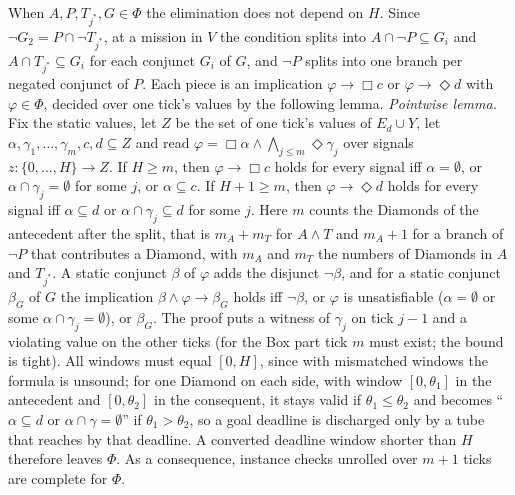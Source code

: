 \documentclass[10pt,a4paper]{article}
\begin{document}
\begin{enumerate}
When $A,P,T_{j^*},G\in\Phi$ the elimination does not depend on $H$. Since $\lnot G_2=P\cap\lnot T_{j^*}$, at a mission in $V$ the condition splits into $A\cap\lnot P\subseteq G_i$ and $A\cap T_{j^*}\subseteq G_i$ for each conjunct $G_i$ of $G$, and $\lnot P$ splits into one branch per negated conjunct of $P$. Each piece is an implication $\varphi\to\Box c$ or $\varphi\to\Diamond d$ with $\varphi\in\Phi$, decided over one tick's values by the following lemma. \emph{Pointwise lemma.} Fix the static values, let $Z$ be the set of one tick's values of $E_d\cup Y$, let $\alpha,\gamma_1,\dots,\gamma_m,c,d\subseteq Z$ and read $\varphi=\Box\alpha\wedge\bigwedge_{j\le m}\Diamond\gamma_j$ over signals $z:\{0,\dots,H\}\to Z$. If $H\ge m$, then $\varphi\to\Box c$ holds for every signal iff $\alpha=\emptyset$, or $\alpha\cap\gamma_j=\emptyset$ for some $j$, or $\alpha\subseteq c$. If $H+1\ge m$, then $\varphi\to\Diamond d$ holds for every signal iff $\alpha\subseteq d$ or $\alpha\cap\gamma_j\subseteq d$ for some $j$. Here $m$ counts the Diamonds of the antecedent after the split, that is $m_A+m_T$ for $A\wedge T$ and $m_A+1$ for a branch of $\lnot P$ that contributes a Diamond, with $m_A$ and $m_T$ the numbers of Diamonds in $A$ and $T_{j^*}$. A static conjunct $\beta$ of $\varphi$ adds the disjunct $\lnot\beta$, and for a static conjunct $\beta_G$ of $G$ the implication $\beta\wedge\varphi\to\beta_G$ holds iff $\lnot\beta$, or $\varphi$ is unsatisfiable ($\alpha=\emptyset$ or some $\alpha\cap\gamma_j=\emptyset$), or $\beta_G$. The proof puts a witness of $\gamma_j$ on tick $j-1$ and a violating value on the other ticks (for the Box part tick $m$ must exist; the bound is tight). All windows must equal $[0,H]$, since with mismatched windows the formula is unsound; for one Diamond on each side, with window $[0,\theta_1]$ in the antecedent and $[0,\theta_2]$ in the consequent, it stays valid if $\theta_1\le\theta_2$ and becomes ``$\alpha\subseteq d$ or $\alpha\cap\gamma=\emptyset$'' if $\theta_1>\theta_2$, so a goal deadline is discharged only by a tube that reaches by that deadline. A converted deadline window shorter than $H$ therefore leaves $\Phi$. As a consequence, instance checks unrolled over $m+1$ ticks are complete for $\Phi$.


\end{enumerate}
\end{document}

